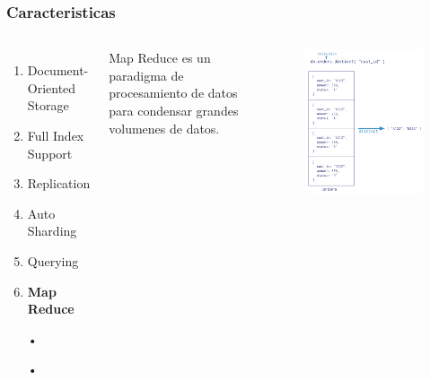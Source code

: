 \documentclass{beamer}
\begin{document}
\begin{frame}
\frametitle{Caracteristicas}
\begin{columns}[c] %

\begin{enumerate}
\item Document-Oriented Storage
\item Full Index Support
\item Replication
\item Auto Sharding
\item Querying
\item \textbf{Map Reduce}
\item[•]	
\item[•]	
\end{enumerate}

Map Reduce es un paradigma de procesamiento de datos para condensar grandes volumenes de datos.
\begin{figure}
\includegraphics[width=0.5\linewidth]{distinct.png}
\end{figure}
\end{columns}
\end{frame}
\end{document}
